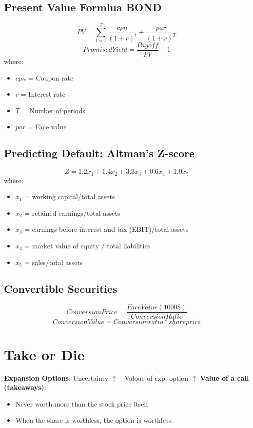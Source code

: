 \documentclass{cheatsheet}
\begin{document}
\subsection{Present Value Formlua BOND}
\[PV = \sum_{t=1}^{T}\frac{cpn}{(1+r)^{t}}+\frac{par}{(1+r)^{T}}\]
\[Promised Yield = \frac{Payoff}{PV} - 1\]
\noindent where:
\begin{itemize}
  \item $cpn$ = Coupon rate
  \item $r$ = Interest rate
  \item $T$ = Number of periods
  \item $par$ = Face value
\end{itemize}

\subsection{Predicting Default: Altman's Z-score}
\[Z = 1.2x_1 + 1.4x_2 + 3.3x_3 + 0.6x_4 + 1.0x_5\]
\noindent where:
\begin{itemize}
  \item $x_1$ = working capital/total assets
  \item $x_2$ = retained earnings/total assets
  \item $x_3$ = earnings before interest and tax (EBIT)/total assets
  \item $x_4$ = market value of equity / total liabilities
  \item $x_5$ = sales/total assets
\end{itemize}
\subsection{Convertible Securities}
\[Conversion Price = \frac{Face Value (1000\$)}{Conversion Ratio}\]
\[Conversion Value = Conversion ratio * share price\]
\section{Take or Die}
\textbf{Expansion Options}: Uncertainty $\uparrow$ - Valoue of exp. option $\uparrow$
\textbf{Value of a call (takeaways)}: 
\begin{itemize}
  \item Never worth more than the stock price itself.
  \item When the share is worthless, the option is worthless.
\end{itemize}
\end{document}
